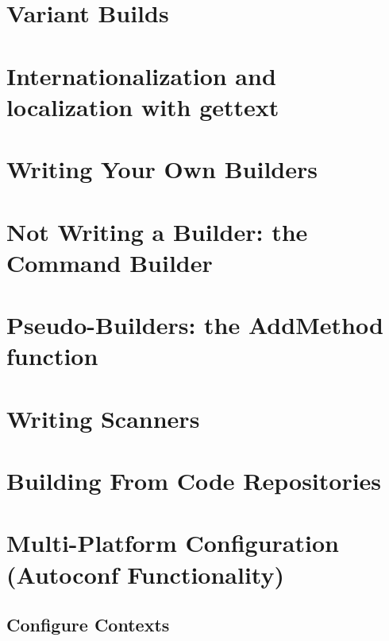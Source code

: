 \documentclass[12pt,a4paper]{article}
\begin{document}
\section{Variant Builds}


\section{Internationalization and localization with gettext}

\section{Writing Your Own Builders}

\section{Not Writing a Builder: the Command Builder}

\section{Pseudo-Builders: the AddMethod function}

\section{Writing Scanners}

\section{Building From Code Repositories}


\section{Multi-Platform Configuration (Autoconf Functionality)}

\subsection{Configure Contexts}
\end{document}
